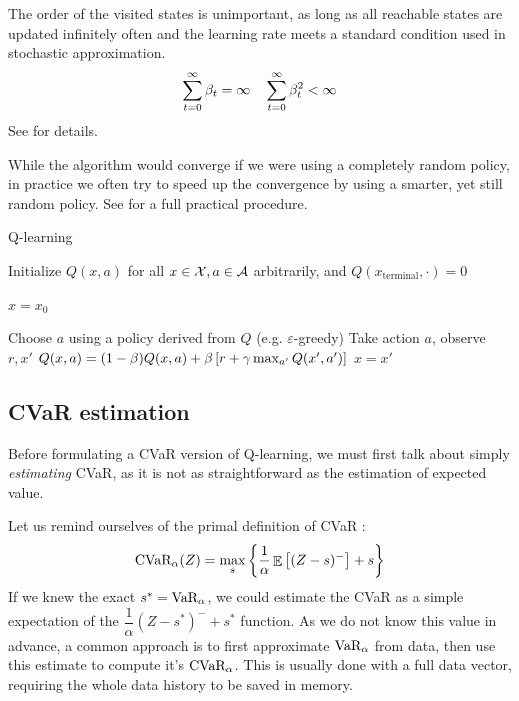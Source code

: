 The order of the visited states is unimportant, as long as all reachable states are updated infinitely often and the learning rate meets a standard condition used in stochastic approximation.
\begin{equation}\label{eqn:beta}
\sum_{t=0}^\infty \beta_t = \infty  \quad \sum_{t=0}^\infty \beta_t^2 < \infty\\
\end{equation}
See \citet{jaakkola1994convergence} for details.

While the algorithm would converge if we were using a completely random policy, in practice we often try to speed up the convergence by using a smarter, yet still random policy. See  for a full practical procedure.


\begin{algorithm}
\caption{Q-learning}
\begin{algorithmic}\label{alg:qlearning}
    \STATE Initialize $Q(x, a)$ for all $x \in \mathcal{X}, a \in \mathcal{A}$ arbitrarily, and $Q(x_\text{terminal}, \cdot) = 0$
    
		
	\STATE $x = x_0$
	
	\STATE Choose $a$ using a policy derived from $Q$ (e.g. $\varepsilon$-greedy)
	\STATE Take action $a$, observe $r, x'$
	\STATE $Q(x, a) = (1-\beta)Q(x, a) + \beta\left[ {r + \gamma \max_{a'} Q(x', a')} \right]$
	\STATE $x = x'$	
	\ENDWHILE
	
	\ENDFOR
\end{algorithmic}
\end{algorithm}


\subsection{CVaR estimation}\label{sec:cvarestimation}

Before formulating a CVaR version of Q-learning, we must first talk about simply \emph{estimating} CVaR, as it is not as straightforward as the estimation of expected value.

Let us remind ourselves of the primal definition of CVaR :
\begin{equation*}
\text{CVaR}_\alpha(Z)=
\max_s\left\lbrace \dfrac{1}{\alpha}\mathop{\mathbb{E}}
\left[ (Z-s)^-\right] + s  \right\rbrace 
\end{equation*}
If we knew the exact $s^*=\text{VaR}_\alpha$, we could estimate the CVaR as a simple expectation of the $\dfrac{1}{\alpha}(Z-s^*)^-+s^*$ function. As we do not know this value in advance, a common approach is to first approximate $\text{VaR}_\alpha$ from data, then use this estimate to compute it's $\text{CVaR}_\alpha$. This is usually done with a full data vector, requiring the whole data history to be saved in memory.

